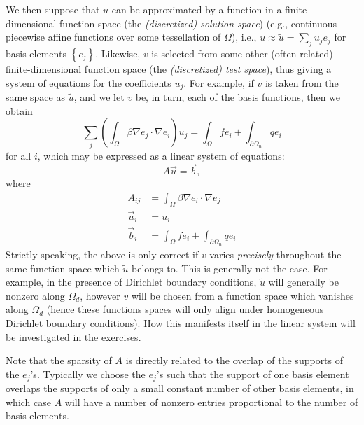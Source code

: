 We then suppose that $u$ can be approximated by a function in a finite-di\-men\-sion\-al function space (the \emph{(discretized) solution space}) (e.g., continuous piecewise affine functions over some tessellation of $\Omega$), i.e., $u \approx \tilde{u} = \sum_j u_j e_j$ for basis elements $\left\{ e_j \right\}$. Likewise, $v$ is selected from some other (often related) finite-dimensional function space (the \emph{(discretized) test space}), thus giving a system of equations for the coefficients $u_j$. For example, if $v$ is taken from the same space as $\tilde{u}$, and we let $v$ be, in turn, each of the basis functions, then we obtain
\begin{equation}\label{eq:poisson.system.i}
\sum_j \left( \int_{\Omega} \beta \nabla e_j \cdot \nabla e_i \right) u_j = \int_{\Omega} f e_i + \int_{\partial \Omega_n} q e_i
\end{equation}
for all $i$, which may be expressed as a linear system of equations:
\begin{equation}\label{eq:poisson.system.a}
A \vec{u} = \vec{b},
\end{equation}
where
\begin{subequations}\label{eq:poisson.system.b}
\begin{align}
A_{ij} & = \int_{\Omega} \beta \nabla e_i \cdot \nabla e_j \label{eq:poisson.system.Aij} \\
\vec{u}_i & = u_i \\
\vec{b}_i & = \int_{\Omega} f e_i + \int_{\partial \Omega_n} q e_i \label{eq:poisson.system.bi}
\end{align}
\end{subequations}
Strictly speaking, the above is only correct if $v$ varies \emph{precisely} throughout the same function space which $\tilde{u}$ belongs to. This is generally not the case. For example, in the presence of Dirichlet boundary conditions, $\tilde{u}$ will generally be nonzero along $\Omega_d$, however $v$ will be chosen from a function space which vanishes along $\Omega_d$ (hence these functions spaces will only align under homogeneous Dirichlet boundary conditions). How this manifests itself in the linear system will be investigated in the exercises.

Note that the sparsity of $A$ is directly related to the overlap of the supports of the $e_j$'s. Typically we choose the $e_j$'s such that the support of one basis element overlaps the supports of only a small constant number of other basis elements, in which case $A$ will have a number of nonzero entries proportional to the number of basis elements.

